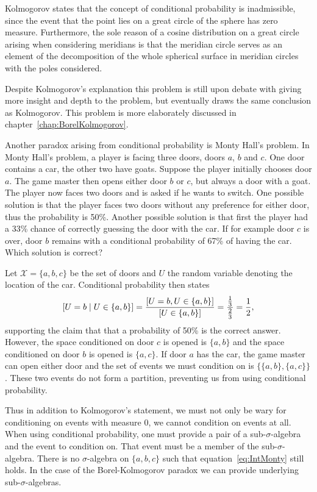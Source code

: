 \documentclass[twoside,a4paper]{report}
\theoremstyle{plain}
\theoremstyle{definition}
\theoremstyle{remark}
\numberwithin{equation}{chapter}
\let\P\relax
\DeclareMathOperator{\P}{\mathbb{P}}
\DeclareMathOperator{\1}{\mathbbm{1}}
\newcommand{\X}{\mathcal{X}}
\begin{document}
Kolmogorov states that the concept of conditional probability is inadmissible, since the event that the point lies on a great circle of the sphere has zero measure. Furthermore, the sole reason of a cosine distribution on a great circle arising when considering meridians is that the meridian circle serves as an element of the decomposition of the whole spherical surface in meridian circles with the poles considered.

Despite Kolmogorov's explanation this problem is still upon debate with \cite{Gyenis17} giving more insight and depth to the problem, but eventually draws the same conclusion as Kolmogorov. This problem is more elaborately discussed in chapter~\ref{chap:BorelKolmogorov}.

Another paradox arising from conditional probability is Monty Hall's problem. In Monty Hall's problem, a player is facing three doors, doors $a$, $b$ and $c$. One door contains a car, the other two have goats. Suppose the player initially chooses door $a$. The game master then opens either door $b$ or $c$, but always a door with a goat. The player now faces two doors and is asked if he wants to switch. One possible solution is that the player faces two doors without any preference for either door, thus the probability is 50\%. Another possible solution is that first the player had a 33\% chance of correctly guessing the door with the car. If for example door $c$ is over, door $b$ remains with a conditional probability of 67\% of having the car. Which solution is correct?

Let $\X=\{a,b,c\}$ be the set of doors and $U$ the random variable denoting the location of the car. Conditional probability then states
\begin{equation}\label{eq:IntMonty}
\P[U=b\mid U\in\{a,b\}]=\frac{\P[U=b,U\in\{a,b\}]}{\P[U\in\{a,b\}]}=\frac{\frac{1}{3}}{\frac{2}{3}}=\frac{1}{2},
\end{equation}
supporting the claim that that a probability of 50\% is the correct answer. However, the space conditioned on door $c$ is opened is $\{a,b\}$ and the space conditioned on door $b$ is opened is $\{a,c\}$. If door $a$ has the car, the game master can open either door and the set of events we must condition on is $\{\{a,b\},\{a,c\}\}$. These two events do not form a partition, preventing us from using conditional probability.

Thus in addition to Kolmogorov's statement, we must not only be wary for conditioning on events with measure 0, we cannot condition on events at all. When using conditional probability, one must provide a pair of a sub-$\sigma$-algebra and the event to condition on. That event must be a member of the sub-$\sigma$-algebra. There is no $\sigma$-algebra on $\{a,b,c\}$ such that equation~\eqref{eq:IntMonty} still holds. In the case of the Borel-Kolmogorov paradox we can provide underlying sub-$\sigma$-algebras.
\end{document}
